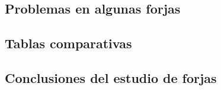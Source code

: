 
\subsection{Problemas en algunas forjas}
\label{sub:problemas}


\subsection{Tablas comparativas}
\label{sub:comparativa}


\subsection{Conclusiones del estudio de forjas}
\label{sub:conclusiones}

